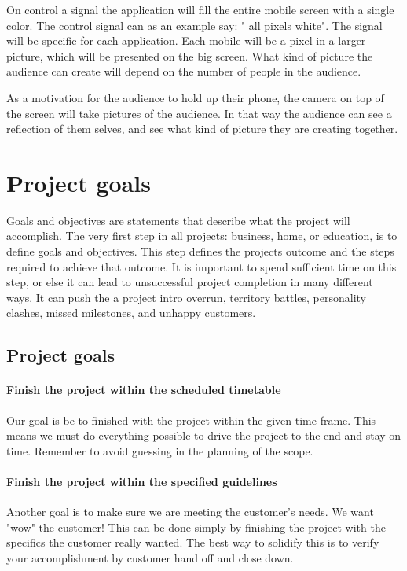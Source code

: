 On control a signal the application will fill the entire mobile screen with a single color.
The control signal can as an example say: " all pixels white". 
The signal will be specific for each application.
Each mobile will be a pixel in a larger picture, which will be presented on the big screen. 
What kind of picture the audience can create will depend on the number of people in the audience.   

As a motivation for the audience to hold up their phone, the camera on top of the screen will take pictures of the audience.
In that way the audience can see a reflection of them selves, and see what kind of picture they are creating together.

\section{Project goals}
Goals and objectives are statements that describe what the project will accomplish. The very first step in all projects: business, home, or education, is to define goals and objectives. 
This step defines the projects outcome and the steps required to achieve that outcome. 
It is important to spend sufficient time on this step, or else it can lead to unsuccessful project completion in many different ways. It can push the  a project intro overrun, territory battles, personality clashes, missed milestones, and unhappy customers. 
   
\label{sec:project-goals}

\subsection{Project goals}

\paragraph{Finish the project within the scheduled timetable}
Our goal is be to finished with the project within the given time frame. This means we must do everything possible to drive the project to the end and stay on time. Remember to avoid guessing in the planning of the scope.

\paragraph{Finish the project within the specified guidelines}
Another goal is to make sure we are meeting the customer's needs. We want "wow" the customer! 
This can be done simply by finishing the project with the specifics the customer really wanted. The best way to solidify this is to verify your accomplishment by customer hand off and close down.

